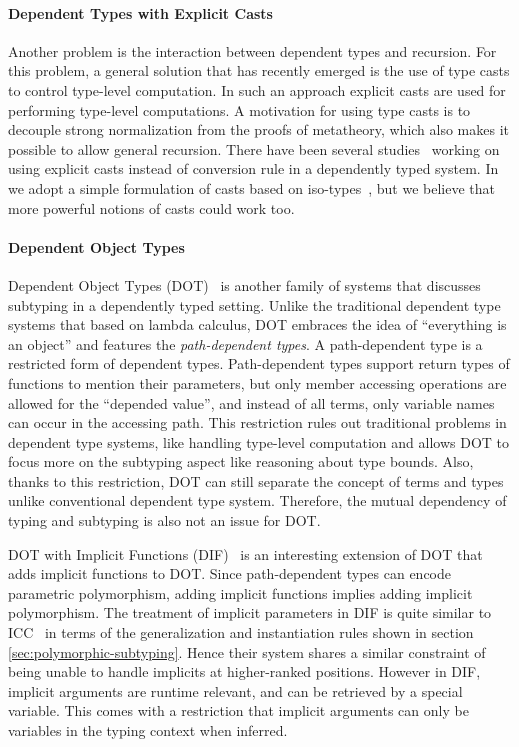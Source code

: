 \paragraph{Dependent Types with Explicit Casts} Another problem is the
interaction between dependent types and recursion. For this
problem, a general solution that has recently emerged is the use
of type casts to control type-level computation. In such an approach explicit casts
are used for performing type-level computations. A motivation for
using type casts is to decouple strong normalization from the
proofs of metatheory, which also makes it possible to allow general
recursion. There have been several studies~\citep{guru,sjoberg:msfp12,
  kimmel:plpv, zombie:popl15, fc:kind, Doorn:2013hq,isotype} working
on using explicit casts instead of conversion rule in a dependently
typed system. In \name we adopt a simple formulation of casts based
on iso-types~\citep{isotype}, but we believe that more powerful notions
of casts could work too.

\paragraph{Dependent Object Types}

Dependent Object Types (DOT)~\citep{dot:dot,dot:path,dot:sound} is another
family of systems that discusses subtyping in a dependently typed setting.
Unlike the traditional dependent type systems that based on lambda calculus, DOT
embraces the idea of ``everything is an object'' and features the \emph{path-dependent types}.
A path-dependent type is a restricted form of dependent types.
Path-dependent types support return types of functions to mention their parameters, but only
member accessing operations are allowed for the ``depended value'',
and instead of all terms, only variable names can occur in the accessing path.
This restriction rules out traditional problems in dependent type systems,
like handling type-level computation and allows DOT to focus more on the subtyping
aspect like reasoning about type bounds. Also, thanks to this restriction, DOT
can still separate the concept of terms and types unlike conventional dependent type system.
Therefore, the mutual dependency of typing and subtyping is also not an issue for DOT.

DOT with Implicit Functions (DIF)~\citep{dif} is an interesting extension of DOT
that adds implicit functions to DOT.
Since path-dependent types can encode parametric
polymorphism, adding implicit functions implies adding implicit polymorphism.
The treatment of implicit parameters in DIF is quite similar
to ICC~\citep{miquel2001implicit} in terms of the generalization and
instantiation rules shown in section \ref{sec:polymorphic-subtyping}.
Hence their system shares a similar constraint of being unable to handle implicits
at higher-ranked positions. However in DIF, implicit arguments are runtime relevant,
and can be retrieved by a special variable. This comes with a restriction that
implicit arguments can only be variables in the typing context when inferred.


